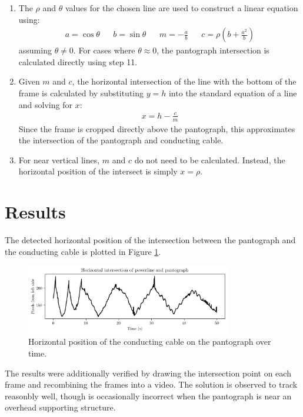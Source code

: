 \begin{enumerate}
  \item The $\rho$ and $\theta$ values for the chosen line are used to construct a linear equation using:
  \begin{align}
    a = \cos\theta && b = \sin\theta && m = -\frac{a}{b} && c = \rho \left(b + \frac{a^2}{b}\right)
  \end{align}
  assuming $\theta \neq 0$. For cases where $\theta \approx 0$, the pantograph intersection is calculated directly using step 11.

  \item Given $m$ and $c$, the horizontal intersection of the line with the bottom of the frame is calculated by substituting $y=h$ into the standard equation of a line and solving for $x$:
  \begin{align}
    x = h - \frac{c}{m}
  \end{align}
  Since the frame is cropped directly above the pantograph, this approximates the intersection of the pantograph and conducting cable.

  \item For near vertical lines, $m$ and $c$ do not need to be calculated. Instead, the horizontal position of the intersect is simply $x=\rho$.

\end{enumerate}

\section{Results}

The detected horizontal position of the intersection between the pantograph and the conducting cable is plotted in Figure \ref{fig:q2results}.

\begin{figure}[ht]
  \centering
  \includegraphics[width=0.8\textwidth]{images/q2_results_a.png}
  \caption{Horizontal position of the conducting cable on the pantograph over time.}
  \label{fig:q2results}
\end{figure}

The results were additionally verified by drawing the intersection point on each frame and recombining the frames into a video. The solution is observed to track reasonbly well, though is occasionally incorrect when the pantograph is near an overhead supporting structure.

